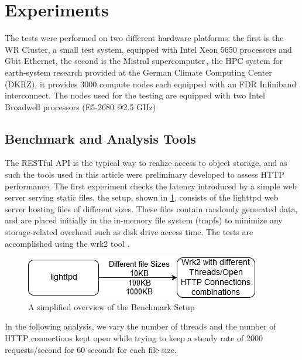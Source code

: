 \documentclass[runningheads]{llncs}
\begin{document}
\section{Experiments}
\label{sec:experiments}
The tests were performed on two different hardware platforms: the first is the WR Cluster, a small test system, equipped with Intel Xeon 5650 processors and Gbit Ethernet, the second is the Mistral supercomputer\,\cite{mistral}, the HPC system for earth-system research provided at the German Climate Computing Center (DKRZ), it provides 3000 compute nodes each equipped with an FDR Infiniband interconnect. The nodes used for the testing are equipped with two Intel Broadwell processors (E5-2680 @2.5 GHz) \cite{intel-xeon}

\subsection{Benchmark and Analysis Tools}\label{subsec:benchmark1}
The RESTful API is the typical way to realize access to object storage, and as such the tools used in this article were preliminary developed to assess HTTP performance.
The first experiment checks the latency introduced by a simple web server serving static files, the setup, shown in \cref{fig:wrk2bench}, consists of the lighttpd web server \cite{lighttpd} hosting files of different sizes. These files contain randomly generated data, and are placed initially in the in-memory file system (tmpfs) to minimize any storage-related overhead such as disk drive access time. The tests are accomplished using the wrk2 tool \cite{wrk2URL}.
\begin{figure}[H]
\centering
\includegraphics[width=.6\linewidth]{wrk2bench.png}
\caption{A simplified overview of the Benchmark Setup}
\vspace{-1.5em}
\label{fig:wrk2bench}
\end{figure}
In the following analysis, we vary the number of threads and the number of HTTP connections kept open while trying to keep a steady rate of 2000 requests/second for 60 seconds for each file size.
\end{document}
